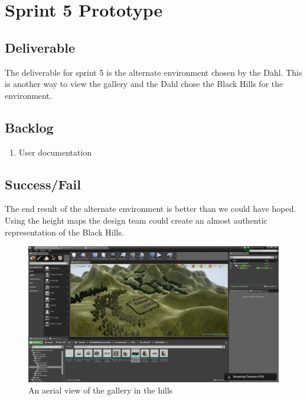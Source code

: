 \section{Sprint 5 Prototype}
\subsection{Deliverable}
The deliverable for sprint 5 is the alternate environment chosen by the Dahl.  This is another way to view the gallery and the Dahl chose the Black Hills for the environment.
\subsection{Backlog}
\begin{enumerate}
\item User documentation
\end{enumerate}
\subsection{Success/Fail}
The end result of the alternate environment is better than we could have hoped.  Using the height maps the design team could create an almost authentic representation of the Black Hills.
\begin{figure}
\centering
\includegraphics[scale=0.4]{Diagrams/environment.png}
\caption{An aerial view of the gallery in the hills}
\end{figure}

